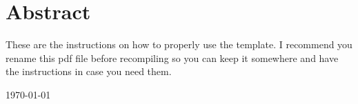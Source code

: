 %
%
% 
%
% 




\chapter*{Abstract}
These are the instructions on how to properly use the template. I recommend you rename this pdf file before recompiling so you can keep it somewhere and have the instructions in case you need them.
\begin{center}
	\today
\end{center}

\vfill

